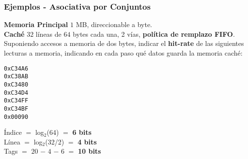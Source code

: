 \documentclass[aspectratio=169]{beamer}
\begin{document}
\begin{frame}[t]
\frametitle{Ejemplos - Asociativa por Conjuntos}
    \small
    \textbf{Memoria Principal} $1$ MB, direccionable a byte.\\
    \textbf{Caché}  $32$ l\'ineas de $64$ bytes cada una, 2 v\'ias, \textcolor{verdeuca}{\textbf{política de remplazo FIFO}}.\\ 
    \bigskip
    Suponiendo accesos a memoria de dos bytes, indicar el \textbf{hit-rate} de las siguientes lecturas a memoria, indicando en cada paso qué datos guarda la memoria caché:\\
    \begin{center}
    \texttt{0xC34A6}\\
    \texttt{0xC38AB}\\
    \texttt{0xC3480}\\
    \texttt{0xC34D4}\\
    \texttt{0xC34FF}\\
    \texttt{0xC34BF}\\
    \texttt{0x00090}
    \end{center}
    \textcolor{naranjauca}{Índice} $=$ log$_2$(64) $=$ \textbf{6 bits}\\
    \textcolor{naranjauca}{Línea} $=$ log$_2$(32/2) $=$ \textbf{4 bits}\\
    \textcolor{naranjauca}{Tags} $=$ $20$ $-$ $4$ $-$ $6$ $=$ \textbf{10 bits}\\
\end{frame}
\end{document}

